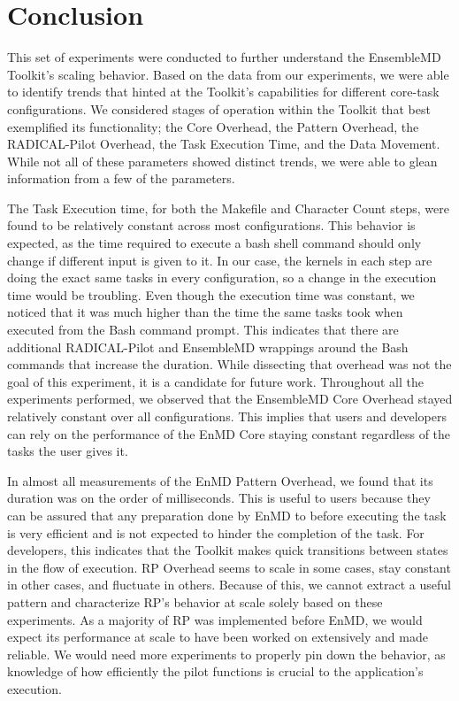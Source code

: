 \documentclass[]{article}
\begin{document}
\section{Conclusion}
	This set of experiments were conducted to further understand the EnsembleMD Toolkit's scaling behavior. Based on the data from our experiments, we were able to identify trends that hinted at the Toolkit's capabilities for different core-task configurations. We considered stages of operation within the Toolkit that best exemplified its functionality; the Core Overhead, the Pattern Overhead, the RADICAL-Pilot Overhead, the Task Execution Time, and the Data Movement. While not all of these parameters showed distinct trends, we were able to glean information from a few of the parameters.

	The Task Execution time, for both the Makefile and Character Count steps, were found to be relatively constant across most configurations. This behavior is expected, as the time required to execute a bash shell command should only change if different input is given to it. In our case, the kernels in each step are doing the exact same tasks in every configuration, so a change in the execution time would be troubling. Even though the execution time was constant, we noticed that it was much higher than the time the same tasks took when executed from the Bash command prompt. This indicates that there are additional RADICAL-Pilot and EnsembleMD wrappings around the Bash commands that increase the duration. While dissecting that overhead was not the goal of this experiment, it is a candidate for future work.
	Throughout all the experiments performed, we observed that the EnsembleMD Core Overhead stayed relatively constant over all configurations. This implies that users and developers can rely on the performance of the EnMD Core staying constant regardless of the tasks the user gives it.
	
	In almost all measurements of the EnMD Pattern Overhead, we found that its duration was on the order of milliseconds. This is useful to users because they can be assured that any preparation done by EnMD to before executing the task is very efficient and is not expected to hinder the completion of the task. For developers, this indicates that the Toolkit makes quick transitions between states in the flow of execution.
	RP Overhead seems to scale in some cases, stay constant in other cases, and fluctuate in others. Because of this, we cannot extract a useful pattern and characterize RP's behavior at scale solely based on these experiments. As a majority of RP was implemented before EnMD, we would expect its performance at scale to have been worked on extensively and made reliable. We would need more experiments to properly pin down the behavior, as knowledge of how efficiently the pilot functions is crucial to the application's execution.
\end{document}
